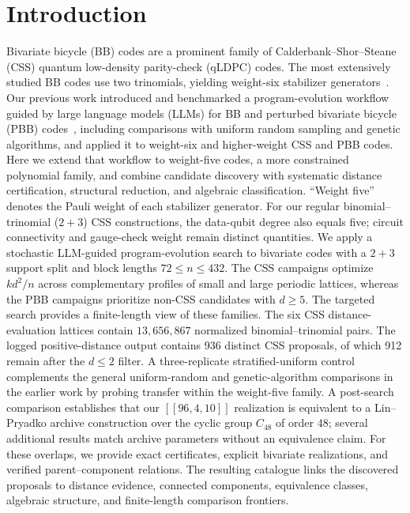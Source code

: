 \documentclass[aps,prx,twocolumn,superscriptaddress,nofootinbib,floatfix]{revtex4-2}
\newcommand{\code}[1]{\ensuremath{\left[\!\left[#1\right]\!\right]}}
\begin{document}
\section{Introduction}

Bivariate bicycle (BB) codes are a prominent family of
Calderbank--Shor--Steane (CSS) quantum low-density parity-check (qLDPC) codes.
The most extensively studied BB codes use two trinomials, yielding weight-six
stabilizer generators~\cite{bravyi2024high}.  Our previous work introduced and
benchmarked a program-evolution workflow guided by large language models (LLMs)
for BB and perturbed bivariate bicycle (PBB)
codes~\cite{cruzbenito2026evolutionary},
including comparisons with uniform random sampling and genetic algorithms,
and applied it to weight-six and higher-weight CSS and PBB codes.  Here we
extend that workflow to weight-five codes, a more constrained polynomial
family, and combine candidate discovery with systematic distance
certification, structural reduction, and algebraic classification.
``Weight five'' denotes the Pauli weight of each stabilizer generator.
For our regular binomial--trinomial ($2+3$) CSS constructions, the data-qubit
degree also equals five; circuit connectivity and gauge-check weight remain
distinct quantities.  We apply a stochastic LLM-guided program-evolution
search to bivariate codes with a
$2+3$ support split and block lengths $72\leq n\leq432$.  The CSS campaigns
optimize $kd^2/n$ across complementary profiles of small and large periodic
lattices, whereas
the PBB campaigns prioritize non-CSS candidates with $d\geq5$.  The targeted
search provides a finite-length view of these families.  The six CSS
distance-evaluation lattices contain
$13{,}656{,}867$ normalized binomial--trinomial pairs.  The logged
positive-distance output contains 936 distinct CSS proposals, of which 912
remain after the $d\leq2$ filter.
A three-replicate stratified-uniform control complements the general
uniform-random and genetic-algorithm comparisons in the earlier work by
probing transfer within the weight-five family.  A post-search comparison
establishes that our $\code{96,4,10}$ realization is equivalent to a
Lin--Pryadko archive construction over the cyclic group $C_{48}$ of order 48;
several additional results match archive parameters without an equivalence
claim.  For these overlaps, we provide exact certificates, explicit bivariate
realizations, and verified parent--component relations.
The resulting catalogue links the discovered proposals to distance evidence,
connected components, equivalence classes, algebraic structure, and
finite-length comparison frontiers.
\end{document}
